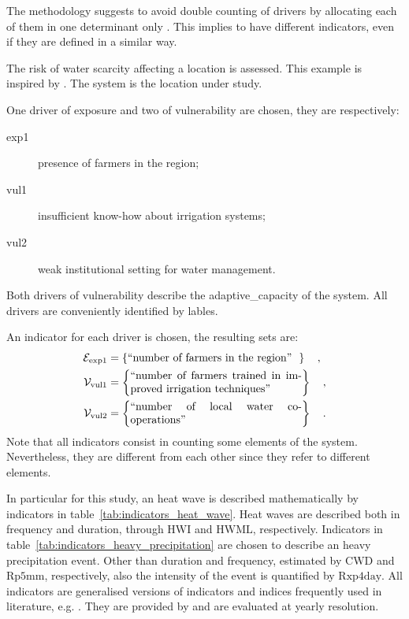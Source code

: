 The methodology suggests to avoid double counting of \glspl{driver} by allocating each of them in one \gls{determinant} only \cite[29]{2017GIZRiskSupplement}. This implies to have different \glspl{indicator}, even if they are defined in a similar way.
\begin{example}
  The risk of water scarcity affecting a location is assessed. This example is inspired by \cite[46]{2017GIZRiskSupplement}. The system is the location under study.
  
  One \gls{driver} of \gls{exposure} and two of \gls{vulnerability} are chosen, they are respectively:
  \begin{description}
    \item[exp1] presence of farmers in the region;
    \item[vul1] insufficient know-how about irrigation systems;
    \item[vul2] weak institutional setting for water management.
  \end{description}
  Both \glspl{driver} of \gls{vulnerability} describe the \gls{adaptive_capacity} of the system. All \glspl{driver} are conveniently identified by lables.
  
  An \gls{indicator} for each \gls{driver} is chosen, the resulting sets are:
  \begin{align*}
    \mathcal{E}_\text{exp1} & = \left\{ \parbox{0.45\linewidth}{``number of farmers in the region''} \right\}
    \quad , \\
    \mathcal{V}_\text{vul1} & = \left\{ \parbox{0.45\linewidth}{``number of farmers trained in improved irrigation techniques''} \right\}
    \quad , \\
    \mathcal{V}_\text{vul2} & = \left\{ \parbox{0.45\linewidth}{``number of local water co-operations''} \right\}
    \quad .
  \end{align*}
  Note that all \glspl{indicator} consist in counting some elements of the system. Nevertheless, they are different from each other since they refer to different elements.
\end{example}

In particular for this study, an heat wave is described mathematically by \glspl{indicator} in table~\ref{tab:indicators_heat_wave}. Heat waves are described both in frequency and duration, through $\mathrm{HWI}$ and $\mathrm{HWML}$, respectively.
Indicators in table~\ref{tab:indicators_heavy_precipitation} are chosen to describe an heavy precipitation event. Other than duration and frequency, estimated by $\mathrm{CWD}$ and $\mathrm{Rp5mm}$, respectively, also the intensity of the event is quantified by $\mathrm{Rxp4day}$.
All indicators are generalised versions of indicators and indices frequently used in literature, e.g. \cite[2208]{2021GutierrezAnnexVI}. They are provided by \cite{2023BourgaultXclimXarray-based} and are evaluated at yearly resolution.

